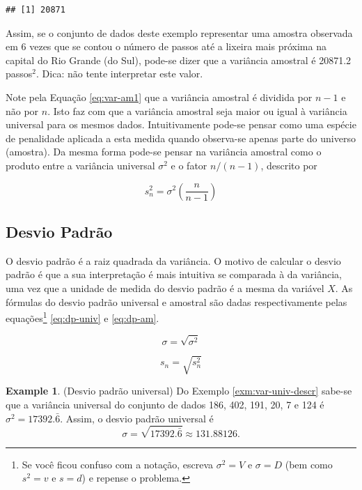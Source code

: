 \documentclass[
]{book}
\theoremstyle{definition}
\theoremstyle{definition}
\newtheorem{example}{Example}[chapter]
\theoremstyle{definition}
\theoremstyle{remark}
\begin{document}
\begin{verbatim}
## [1] 20871
\end{verbatim}

Assim, se o conjunto de dados deste exemplo representar uma amostra observada em 6 vezes que se contou o número de passos até a lixeira mais próxima na capital do Rio Grande (do Sul), pode-se dizer que a variância amostral é 20871.2 passos\(^2\). Dica: não tente interpretar este valor.

Note pela Equação \eqref{eq:var-am1} que a variância amostral é dividida por \(n-1\) e não por \(n\). Isto faz com que a variância amostral seja maior ou igual à variância universal para os mesmos dados. Intuitivamente pode-se pensar como uma espécie de penalidade aplicada a esta medida quando observa-se apenas parte do universo (amostra). Da mesma forma pode-se pensar na variância amostral como o produto entre a variância universal \(\sigma^2\) e o fator \(n/(n-1)\), descrito por

\begin{equation}
s_{n}^2 = \sigma^2 \left( \frac{n}{n-1} \right)
\label{eq:var-univ-am}
\end{equation}

\hypertarget{desvio-padruxe3o}{%
\subsection{Desvio Padrão}\label{desvio-padruxe3o}}

O desvio padrão é a raiz quadrada da variância. O motivo de calcular o desvio padrão é que a sua interpretação é mais intuitiva se comparada à da variância, uma vez que a unidade de medida do desvio padrão é a mesma da variável \(X\). As fórmulas do desvio padrão universal e amostral são dadas respectivamente pelas equações\footnote{Se você ficou confuso com a notação, escreva \(\sigma^2= V\) e \(\sigma=D\) (bem como \(s^2=v\) e \(s=d\)) e repense o problema.} \eqref{eq:dp-univ} e \eqref{eq:dp-am}.

\begin{equation}
\sigma = \sqrt{\sigma^2} 
\label{eq:dp-univ}
\end{equation}

\begin{equation}
s_{n} = \sqrt{s^{2}_{n}}
\label{eq:dp-am}
\end{equation}

\begin{example}
\protect\hypertarget{exm:dp-universal}{}{\label{exm:dp-universal} }(Desvio padrão universal) Do Exemplo \ref{exm:var-univ-descr} sabe-se que a variância universal do conjunto de dados 186, 402, 191, 20, 7 e 124 é \(\sigma^2 = 17392.\bar{6}\). Assim, o desvio padrão universal é \[\sigma = \sqrt{17392.\bar{6}} \approx 131.88126.\]
\end{example}
\end{document}
